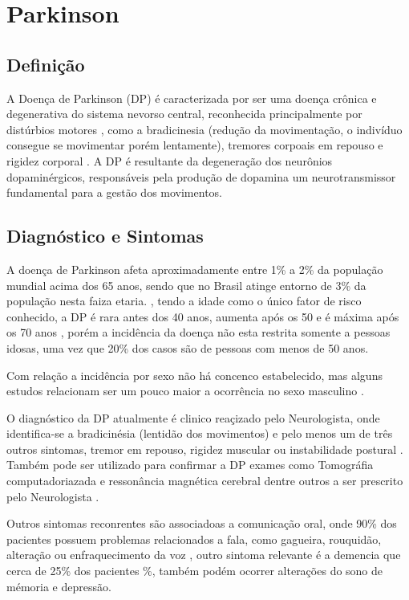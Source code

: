 \chapter{Parkinson}
\section{Definição}
A Doença de Parkinson (DP) é caracterizada por ser uma doença crônica e degenerativa do sistema nevorso central, reconhecida principalmente por distúrbios motores \cite{souzametodos}, como a bradicinesia (redução da movimentação, o indivíduo consegue se movimentar porém lentamente), tremores corpoais em repouso e rigidez corporal \cite{da2016aspectos}. A DP é resultante da degeneração dos neurônios dopaminérgicos, responsáveis pela produção de dopamina um neurotransmissor fundamental para a gestão dos movimentos. 

\section{Diagnóstico e Sintomas}
A doença de Parkinson afeta aproximadamente entre 1\% a 2\% da população mundial acima dos 65 anos, sendo que no Brasil atinge entorno de 3\% da população nesta faiza etaria. \cite{magalhaes2009descobrindo}, tendo a idade como o único fator de risco conhecido, a DP é rara antes dos 40 anos, aumenta após os 50 e é máxima após os 70 anos \cite{peixinho2006alteraccoes}, porém a incidência da doença não esta restrita somente a pessoas idosas, uma vez que 20\% dos casos são de pessoas com menos de 50 anos. \cite{gago2014manual}

Com relação a incidência por sexo não há concenco estabelecido, mas alguns estudos relacionam ser um pouco maior a ocorrência no sexo masculino \cite{peixinho2006alteraccoes}.

O diagnóstico da DP atualmente é clinico reaçizado pelo Neurologista, onde identifica-se a bradicinésia (lentidão dos movimentos) e pelo menos um de três outros sintomas, tremor em repouso, rigidez muscular ou instabilidade postural \cite{gago2014manual}. Também pode ser utilizado para confirmar a DP exames como Tomográfia computadoriazada e ressonância magnética cerebral dentre outros a ser prescrito pelo Neurologista \cite{gago2014manual}.

Outros sintomas reconrentes são associadoas a comunicação oral, onde 90\% dos pacientes possuem problemas relacionados a fala, como gagueira, rouquidão, alteração ou enfraquecimento da voz \cite{zarzur2010laryngeal}, outro sintoma relevante é a demencia que cerca de 25\% dos pacientes \cite{pamplona1996demencia}\%, também podém ocorrer alterações do sono de mémoria e depressão\cite{barbosa2005parkinsons}.

